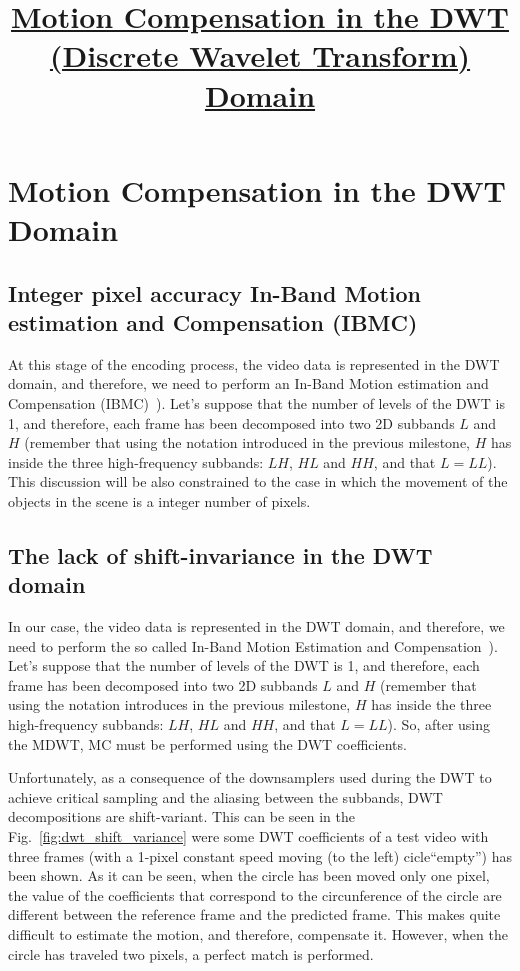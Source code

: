 
\title{\href{https://vicente-gonzalez-ruiz.github.io/motion_estimation/docs/}{Motion Compensation in the DWT (Discrete Wavelet Transform) Domain}}

\maketitle


\section{Motion Compensation in the DWT Domain}

\subsection{Integer pixel accuracy In-Band Motion estimation and Compensation (IBMC)}
At this stage of the encoding process, the video data is represented
in the DWT domain, and therefore, we need to perform an In-Band Motion
estimation and Compensation
(IBMC)~\cite{andreopoulos2005complete}). Let's suppose that the number
of levels of the DWT is 1, and therefore, each frame has been
decomposed into two 2D subbands $L$ and $H$ (remember that using the
notation introduced in the previous milestone, $H$ has inside the
three high-frequency subbands: $LH$, $HL$ and $HH$, and that
$L=LL$). This discussion will be also constrained to the case in which
the movement of the objects in the scene is a integer number of
pixels.

\subsection{The lack of shift-invariance in the DWT domain}
In our case, the video data is represented in the DWT domain, and
therefore, we need to perform the so called In-Band Motion Estimation
and Compensation~\cite{andreopoulos2005complete}). Let's suppose that
the number of levels of the DWT is 1, and therefore, each frame has
been decomposed into two 2D subbands $L$ and $H$ (remember that using
the notation introduces in the previous milestone, $H$ has inside the
three high-frequency subbands: $LH$, $HL$ and $HH$, and that
$L=LL$). So, after using the MDWT, MC must be performed using the DWT
coefficients.

Unfortunately, as a consequence of the downsamplers used during the
DWT to achieve critical sampling and the aliasing between the
subbands, DWT decompositions are shift-variant. This can be seen in
the Fig.~\ref{fig:dwt_shift_variance} were some DWT coefficients of a
test video with three frames (with a 1-pixel constant speed moving (to
the left) cicle``empty'') has been shown. As it can be seen, when the
circle has been moved only one pixel, the value of the coefficients
that correspond to the circunference of the circle are different
between the reference frame and the predicted frame. This makes quite
difficult to estimate the motion, and therefore, compensate
it. However, when the circle has traveled two pixels, a perfect match
is performed.

